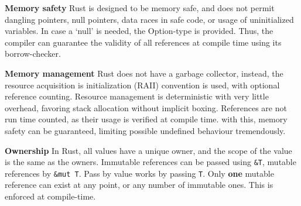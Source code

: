 \textbf{Memory safety}\label{sec:memsafe}
Rust is designed to be memory safe, and does not permit dangling pointers, null
pointers, data races in safe code, or usage of uninitialized variables. In case
a `null' is needed, the Option-type is provided. Thus, the compiler can
guarantee the validity of all references at compile time using its
borrow-checker.


\textbf{Memory management}\label{sec:memmanage}
Rust does not have a garbage collector, instead, the resource acquisition is
initialization (RAII) convention is used, with optional reference counting.
Resource management is deterministic with very little overhead, favoring stack
allocation without implicit boxing. References are not run time counted, as
their usage is verified at compile time. with this, memory safety can be
guaranteed, limiting possible undefined behaviour tremendously.


\textbf{Ownership}\label{sec:ownership}
In Rust, all values have a unique owner, and the scope of the value is the same
as the owners. Immutable references can be passed using \verb|&T|, mutable
references by \verb|&mut T|. Pass by value works by passing \verb|T|. Only
\textbf{one} mutable reference can exist at any point, or any number of
immutable ones. This is enforced at compile-time.


